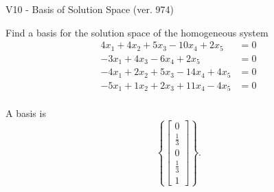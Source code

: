 \begin{exercise}
  \begin{exerciseTitle}V10 - Basis of Solution Space (ver. 974)\end{exerciseTitle}
  \begin{exerciseStatement}
    Find a basis for the solution space of the homogeneous system 
\begin{align*}
 4 x_ 1 + 4 x_ 2 + 5 x_ 3 -10 x_ 4 + 2 x_ 5 &= 0  \\ 
  -3 x_ 1 + 4 x_ 3 -6 x_ 4 + 2 x_ 5 &= 0  \\ 
  -4 x_ 1 + 2 x_ 2 + 5 x_ 3 -14 x_ 4 + 4 x_ 5 &= 0  \\ 
  -5 x_ 1 + 1 x_ 2 + 2 x_ 3 + 11 x_ 4 -4 x_ 5 &= 0  \\ 
 \end{align*}


 
  \end{exerciseStatement}

  \begin{exerciseAnswer}
   A basis is   
\[\left\{\left[\begin{array}{c}
0 \\
\frac{1}{3} \\
0 \\
\frac{1}{3} \\
1
\end{array}\right]\right\}.\]

  


  \end{exerciseAnswer}
\end{exercise}